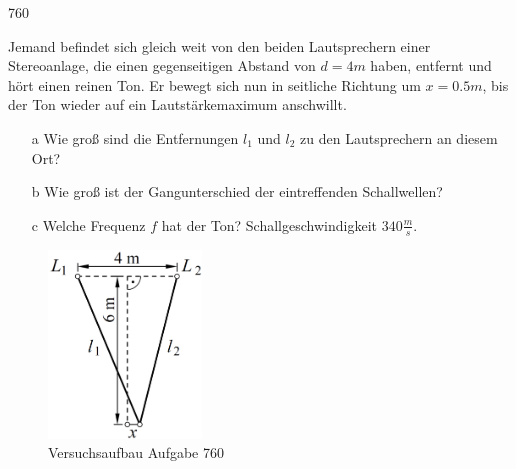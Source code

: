 \begin{auf}
    760
\end{auf}
Jemand befindet sich gleich weit von den beiden Lautsprechern einer Stereoanlage, die einen gegenseitigen Abstand von $d=4m$ haben, entfernt und hört einen reinen Ton. Er bewegt sich nun in seitliche Richtung um $x=0.5m$, bis der Ton wieder auf ein Lautstärkemaximum anschwillt.
\begin{enumerate}
    \item[a] Wie groß sind die Entfernungen $l_1$ und $l_2$ zu den Lautsprechern an diesem Ort?
    \item[b] Wie groß ist der Gangunterschied der eintreffenden	Schallwellen?
    \item[c] Welche Frequenz $f$ hat der Ton? Schallgeschwindigkeit	$340\frac{m}{s}$.
\end{enumerate}
\begin{figure}[h]
    \centering
    \includegraphics[height=5cm]{images/760_0.png}
    \caption{Versuchsaufbau Aufgabe 760}
\end{figure}